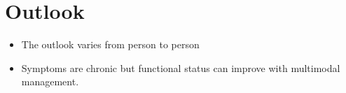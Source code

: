 \section{Outlook}
\begin{itemize}[noitemsep]
  \item The outlook varies from person to person
  \item Symptoms are chronic but functional status can improve with multimodal management.
\end{itemize}
